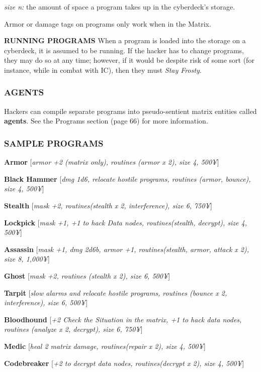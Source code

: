 \documentclass[oneside,10pt]{article}
\begin{document}
\begin{multicols}{2}
\begin{dent}
    \textit{size n:} the amount of space a program takes up in the
    cyberdeck’s storage.
  \end{dent}

  Armor or damage tags on programs only work when in the Matrix.

  \textbf{RUNNING PROGRAMS } When a program is loaded into the storage
  on a cyberdeck, it is assumed to be running. If the hacker has to
  change programs, they may do so at any time; however, if it would
  be despite risk of some sort (for instance, while in combat with
  IC), then they must \textit{Stay Frosty}.

  \subsubsection{AGENTS}
  Hackers can compile separate programs into pseudo-sentient matrix
  entities called \textbf{agents}. See the Programs section (page 66)
  for more information.

  \subsubsection{SAMPLE PROGRAMS}
  \textbf{Armor} [\textit{armor +2 (matrix only), routines (armor x
    2), size 4, 500¥}]

  \textbf{Black Hammer} [\textit{dmg 1d6, relocate hostile programs,
    routines (armor, bounce), size 4, 500¥}]

  \textbf{Stealth} [\textit{mask +2, routines(stealth x 2,
    interference), size 6, 750¥}]

  \textbf{Lockpick} [\textit{mask +1, +1 to hack Data nodes,
    routines(stealth, decrypt), size 4, 500¥}]

  \textbf{Assassin} [\textit{mask +1, dmg 2d6b, armor +1,
    routines(stealth, armor, attack x 2), size 8, 1,000¥}]

  \textbf{Ghost} [\textit{mask +2, routines (stealth x 2), size 6,
    500¥}]

  \textbf{Tarpit} [\textit{slow alarms and relocate hostile programs,
    routines (bounce x 2, interference), size 6, 500¥}]

  \textbf{Bloodhound} [\textit{+2 Check the Situation in the matrix,
    +1 to hack data nodes, routines (analyze x 2, decrypt), size 6,
    750¥}]

  \textbf{Medic} [\textit{heal 2 matrix damage, routines(repair x 2),
    size 4, 500¥}]

  \textbf{Codebreaker} [\textit{+2 to decrypt data nodes,
    routines(decrypt x 2), size 4, 500¥}]


\end{multicols}
\end{document}
